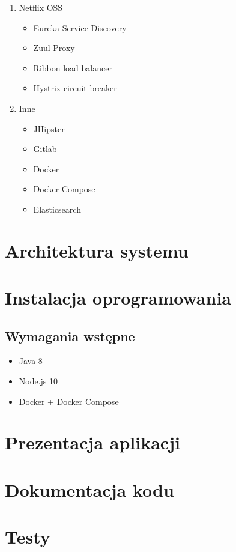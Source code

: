\begin{enumerate}
    \item Netflix OSS\cite{tech:netflix-oss}
    \begin{itemize}
        \item Eureka Service Discovery\cite{tech:netflix-eureka}
        \item Zuul Proxy\cite{tech:netflix-zuul}
        \item Ribbon load balancer\cite{tech:netflix-ribbon}
        \item Hystrix circuit breaker\cite{tech:netflix-hystrix}
    \end{itemize}
    \item Inne
    \begin{itemize}
        \item JHipster\cite{tech:jhipster}
        \item Gitlab\cite{tech:gitlab}
        \item Docker\cite{tech:docker}
        \item Docker Compose\cite{tech:docker-compose}
        \item Elasticsearch\cite{tech:elasticsearch}
    \end{itemize}
\end{enumerate}
\section{Architektura systemu}\label{sec:system-architecture}
\section{Instalacja oprogramowania}\label{sec:software-installation}
\subsection{Wymagania wstępne}\label{subsec:prerequirements}
\begin{itemize}
    \item Java 8\cite{tech:java}
    \item Node.js 10\cite{tech:nodejs}
    \item Docker\cite{tech:docker} + Docker Compose\cite{tech:docker-compose}
\end{itemize}
\section{Prezentacja aplikacji}\label{sec:app-presentation}
\section{Dokumentacja kodu}\label{sec:code-documentation}
\section{Testy}\label{sec:tests}
\thispagestyle{normal}
